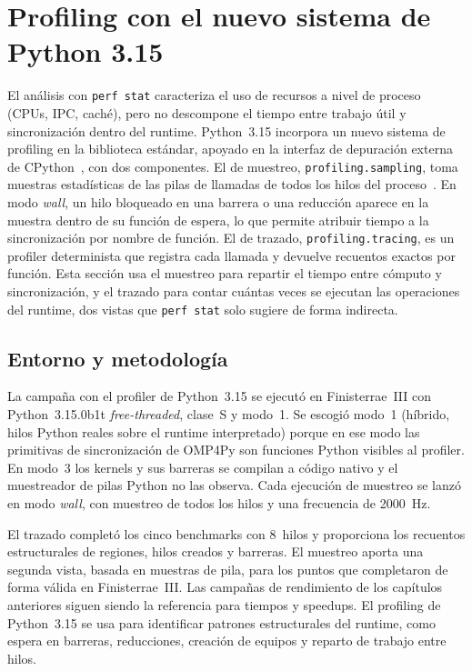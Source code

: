 \section{Profiling con el nuevo sistema de Python 3.15}
\label{sec:profiling-py315}

El análisis con \texttt{perf stat} caracteriza el uso de recursos a nivel de
proceso (CPUs, IPC, caché), pero no descompone el tiempo entre trabajo útil y
sincronización dentro del runtime. Python~3.15 incorpora un nuevo sistema de
profiling en la biblioteca estándar, apoyado en la interfaz de depuración externa
de CPython~\cite{PEP768}, con dos componentes. El de muestreo,
\texttt{profiling.sampling}, toma muestras estadísticas de las pilas de llamadas
de todos los hilos del proceso~\cite{PySamplingProfiler}. En modo \emph{wall}, un
hilo bloqueado en una barrera o una reducción aparece en la muestra dentro de su
función de espera, lo que permite atribuir tiempo a la sincronización por nombre
de función. El de trazado, \texttt{profiling.tracing}, es un profiler
determinista que registra cada llamada y devuelve recuentos exactos por función.
Esta sección usa el muestreo para repartir el tiempo entre cómputo y
sincronización, y el trazado para contar cuántas veces se ejecutan las
operaciones del runtime, dos vistas que \texttt{perf stat} solo sugiere de forma
indirecta.

\subsection{Entorno y metodología}
La campaña con el profiler de Python~3.15 se ejecutó en Finisterrae~III con
Python~3.15.0b1t \emph{free-threaded}, clase~S y modo~1. Se escogió modo~1
(híbrido, hilos Python reales sobre el runtime interpretado) porque en ese modo
las primitivas de sincronización de OMP4Py son funciones Python visibles al
profiler. En modo~3 los kernels y sus barreras se compilan a código nativo y el
muestreador de pilas Python no las observa. Cada ejecución de muestreo se lanzó
en modo \emph{wall}, con muestreo de todos los hilos y una frecuencia de
2000~Hz.

El trazado completó los cinco benchmarks con 8~hilos y proporciona los recuentos
estructurales de regiones, hilos creados y barreras. El muestreo aporta una
segunda vista, basada en muestras de pila, para los puntos que completaron de
forma válida en Finisterrae~III. Las campañas de rendimiento de los capítulos
anteriores siguen siendo la referencia para tiempos y speedups. El profiling de
Python~3.15 se usa para identificar patrones estructurales del runtime, como
espera en barreras, reducciones, creación de equipos y reparto de trabajo entre
hilos.

